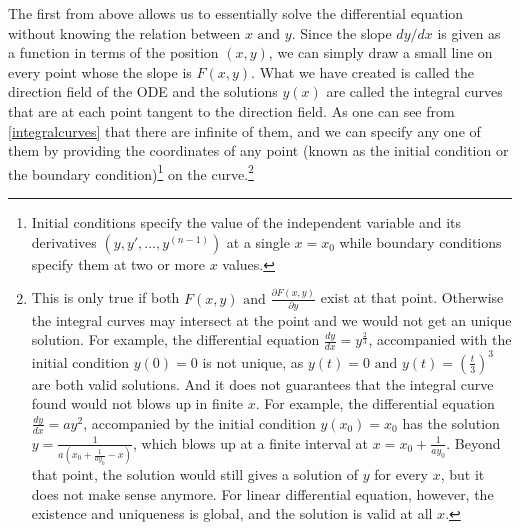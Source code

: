 \documentclass[english,a4paper,12pt]{report}
\begin{document}
The first from above allows us to essentially solve the differential equation without knowing the relation between \(x \text { and } y\). Since the slope \(dy /dx\) is given as a function in terms of the position \((x,y)\), we can simply draw a small line on every point whose the slope is \(F(x,y)\). What we have created is called the direction field of the ODE and the solutions \(y(x)\) are called the integral curves that are at each point tangent to the direction field. As one can see from \cref{integralcurves} that there are infinite of them, and we can specify any one of them by providing the coordinates of any point (known as the initial condition or the boundary condition)\footnote{Initial conditions specify the value of the independent variable and its derivatives \((y,y',\ldots ,y^{(n-1)} )\) at a single \(x = x_0 \) while boundary conditions specify them at two or more \(x\) values.} on the curve.\footnote{This is only true if both \(F(x,y) \text { and } \frac{\partial F(x,y)}{\partial y} \) exist at that point. Otherwise the integral curves may intersect at the point and we would not get an unique solution. For example, the differential equation \(\frac{dy}{dx} = y^{\frac{2}{3} } \), accompanied with the initial condition \(y(0) = 0\) is not unique, as \(y(t) = 0 \text { and } y(t) = (\frac{t}{3} )^3 \) are both valid solutions. And it does not guarantees that the integral curve found would not blows up in finite \(x\). For example, the differential equation \(\frac{dy}{dx} = ay^2 \), accompanied by the initial condition \(y(x_0 )= x_0 \) has the solution \(y = \frac{1}{a(x_0 +\frac{1}{ay_0 }-x )} \), which blows up at a finite interval at \(x = x_0 + \frac{1}{ay_0 } \). Beyond that point, the solution would still gives a solution of \(y\) for every \(x\), but it does not make sense anymore. For linear differential equation, however, the existence and uniqueness is global, and the solution is valid at all \(x\).} 

\end{document}
